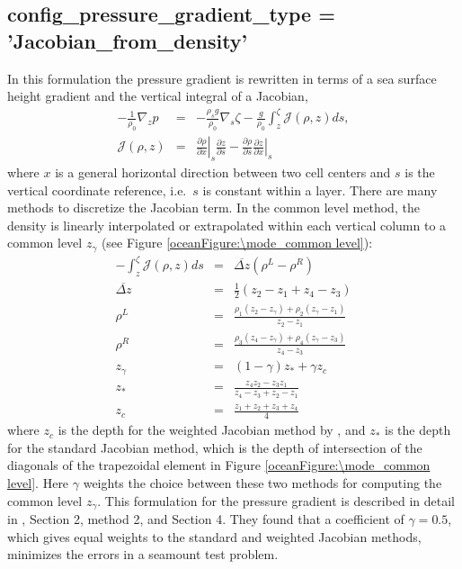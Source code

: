 \subsection{ config\_pressure\_gradient\_type = 'Jacobian\_from\_density'}
In this formulation the pressure gradient is rewritten in terms of a sea surface height gradient and the vertical integral of a Jacobian,
\begin{eqnarray}
\label{ocean:\mode_grad p Jacobian}
- \frac{1}{\rho_0}\nabla_z p &=& - \frac{\rho_s g}{\rho_0}\nabla_s \zeta - \frac{g}{\rho_0}\int_z^\zeta {\mathcal J}(\rho,z)ds, \\
{\mathcal J}(\rho,z) &=& \left. \frac{\partial \rho}{\partial x} \right|_s \frac{\partial z}{\partial s} 
 - \frac{\partial \rho}{\partial s}  \left. \frac{\partial z}{\partial x} \right|_s 
\end{eqnarray}
where $x$ is a general horizontal direction between two cell centers and $s$ is the vertical coordinate reference, i.e.\ $s$ is constant within a layer.  There are many methods to discretize the Jacobian term.  In the common level method, the density is linearly interpolated or extrapolated within each vertical column to a common level $z_\gamma$ (see Figure \ref{oceanFigure:\mode_common level}):
\begin{eqnarray}
- \int_z^\zeta {\mathcal J}(\rho,z)ds &=& \overline{\Delta z} \left( \rho^L - \rho^R \right) \\
\overline{\Delta z} &=& \frac{1}{2} \left(z_2-z_1 + z_4-z_3\right) \\
\rho^L &=& \frac{\rho_1\left(z_2-z_\gamma\right) + \rho_2\left(z_\gamma-z_1\right) }{z_2-z_1}\\
\rho^R &=& \frac{\rho_3\left(z_4-z_\gamma\right) + \rho_4\left(z_\gamma-z_3\right) }{z_4-z_3}\\
z_\gamma &=& \left(1-\gamma\right)z_* + \gamma z_c \\
z_* &=&  \frac{z_4 z_2-z_3z_1}{z_4-z_3 + z_2-z_1} \\
z_c &=&  \frac{z_1+z_2+z_3+z_4}{4} 
\end{eqnarray}
where $z_c$ is the depth for the weighted Jacobian method by \citet{Song98mwr}, and $z_*$ is the depth for the standard Jacobian method, which is the depth of intersection of the diagonals of the trapezoidal element in Figure \ref{oceanFigure:\mode_common level}.  Here $\gamma$ weights the choice between these two methods for computing the common level $z_\gamma$.  This formulation for the pressure gradient is described in detail in \citet{Shchepetkin_McWilliams03jgr}, Section 2, method 2, and Section 4.  They found that a coefficient of $\gamma=0.5$, which gives equal weights to the standard and weighted Jacobian methods, minimizes the errors in a seamount test problem.

